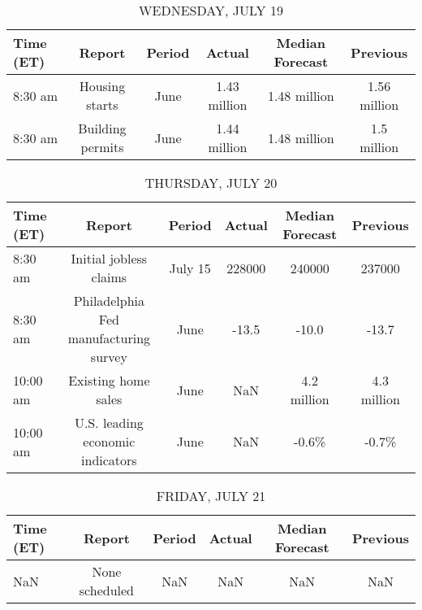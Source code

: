 \documentclass{article}%
\begin{document}
\begin{table}[htbp]%
\caption{WEDNESDAY, JULY 19}%
\centering%
\begin{adjustbox}{width=1\textwidth}%
\begin{tabular}{lccccc}
\toprule
Time (ET) &           Report & Period &       Actual & Median Forecast &     Previous \\
\midrule
  8:30 am &   Housing starts &   June & 1.43 million &    1.48 million & 1.56 million \\
  8:30 am & Building permits &   June & 1.44 million &    1.48 million &  1.5 million \\
\bottomrule
\end{tabular}
%
\end{adjustbox}%
\end{table}

%


\begin{table}[htbp]%
\caption{THURSDAY, JULY 20}%
\centering%
\begin{adjustbox}{width=1\textwidth}%
\begin{tabular}{lccccc}
\toprule
Time (ET) &                                Report &  Period & Actual & Median Forecast &    Previous \\
\midrule
  8:30 am &                Initial jobless claims & July 15 & 228000 &          240000 &      237000 \\
  8:30 am & Philadelphia Fed manufacturing survey &    June &  -13.5 &           -10.0 &       -13.7 \\
 10:00 am &                   Existing home sales &    June &    NaN &     4.2 million & 4.3 million \\
 10:00 am &      U.S. leading economic indicators &    June &    NaN &           -0.6\% &       -0.7\% \\
\bottomrule
\end{tabular}
%
\end{adjustbox}%
\end{table}

%


\begin{table}[htbp]%
\caption{FRIDAY, JULY 21}%
\centering%
\begin{adjustbox}{width=1\textwidth}%
\begin{tabular}{lccccc}
\toprule
Time (ET) &         Report & Period & Actual & Median Forecast & Previous \\
\midrule
      NaN & None scheduled &    NaN &    NaN &             NaN &      NaN \\
\bottomrule
\end{tabular}
%
\end{adjustbox}%
\end{table}
\end{document}
